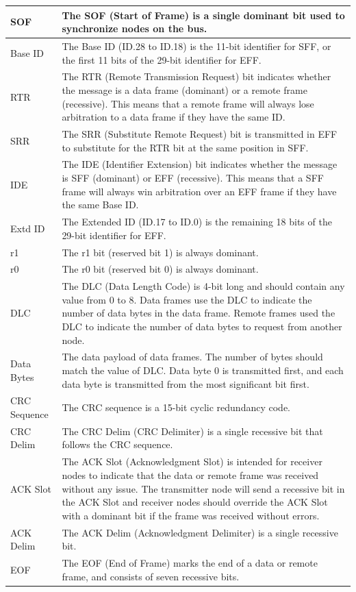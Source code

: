 \begin{longtable}[c]{|p{3.5cm}|p{12cm}|}
    SOF & The SOF (Start of Frame) is a single dominant bit used to synchronize nodes on the bus.
          \\\hline
    Base ID & The Base ID (ID.28 to ID.18) is the 11-bit identifier for SFF, or the first 11 bits of the 29-bit identifier for EFF.
          \\\hline
    RTR & The RTR (Remote Transmission Request) bit indicates whether the message is a data frame (dominant) or a remote frame (recessive). This means that a remote frame will always lose arbitration to a data frame if they have the same ID.                                                    \\\hline
    SRR & The SRR (Substitute Remote Request) bit is transmitted in EFF to substitute for the RTR bit at the same position in SFF.                       
           \\\hline
    IDE & The IDE (Identifier Extension) bit indicates whether the message is SFF (dominant) or EFF (recessive). This means that a SFF frame will always win arbitration over an EFF frame if they have the same Base ID.
            \\\hline
    Extd ID & The Extended ID (ID.17 to ID.0) is the remaining 18 bits of the 29-bit identifier for EFF.
            \\\hline
    r1 & The r1 bit (reserved bit 1) is always dominant.
             \\\hline 
    r0 & The r0 bit (reserved bit 0) is always dominant.
             \\\hline
    DLC & The DLC (Data Length Code) is 4-bit long and should contain any value from 0 to 8. Data frames use the DLC to indicate the number of data bytes in the data frame. Remote frames used the DLC to indicate the number of data bytes to request from another node. 
             \\\hline
    Data Bytes & The data payload of data frames. The number of bytes should match the value of DLC. Data byte 0 is transmitted first, and each data byte is transmitted from the most significant bit first.
             \\\hline
    CRC Sequence & The CRC sequence is a 15-bit cyclic redundancy code.
             \\\hline
    CRC Delim & The CRC Delim (CRC Delimiter) is a single recessive bit that follows the CRC sequence.
              \\\hline
    ACK Slot & The ACK Slot (Acknowledgment Slot) is intended for receiver nodes to indicate that the data or remote frame was received without any issue. The transmitter node will send a recessive bit in the ACK Slot and receiver nodes should override the ACK Slot with a dominant bit if the frame was received without errors.
              \\\hline
    ACK Delim & The ACK Delim (Acknowledgment Delimiter) is a single recessive bit.
              \\\hline
    EOF & The EOF (End of Frame) marks the end of a data or remote frame, and consists of seven recessive bits.
              \\\hline
\end{longtable}
